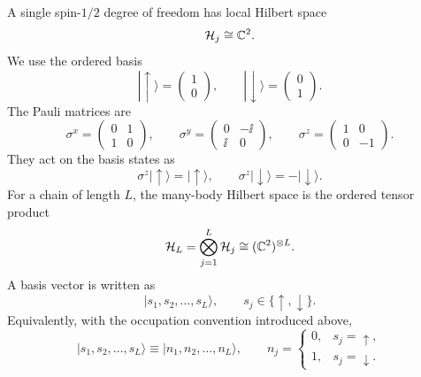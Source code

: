 A single spin-$1/2$ degree of freedom has local Hilbert space
\begin{equation}
    \mathcal{H}_j\cong \mathbb{C}^2.
\end{equation}
We use the ordered basis
\begin{equation}
    |\uparrow\rangle
    =
    \begin{pmatrix}1\\0\end{pmatrix},
    \qquad
    |\downarrow\rangle
    =
    \begin{pmatrix}0\\1\end{pmatrix}.
\end{equation}
The Pauli matrices are
\begin{equation}
    \sigma^x=
    \begin{pmatrix}
        0&1\\
        1&0
    \end{pmatrix},
    \qquad
    \sigma^y=
    \begin{pmatrix}
        0&-\ii\\
        \ii&0
    \end{pmatrix},
    \qquad
    \sigma^z=
    \begin{pmatrix}
        1&0\\
        0&-1
    \end{pmatrix}.
\end{equation}
They act on the basis states as
\begin{equation}
    \sigma^z|\uparrow\rangle=|\uparrow\rangle,
    \qquad
    \sigma^z|\downarrow\rangle=-|\downarrow\rangle.
\end{equation}
For a chain of length $L$, the many-body Hilbert space is the ordered tensor
product
\begin{equation}
    \mathcal{H}_L
    =
    \bigotimes_{j=1}^{L}\mathcal{H}_j
    \cong
    (\mathbb{C}^2)^{\otimes L}.
\end{equation}
A basis vector is written as
\begin{equation}
    |s_1,s_2,\ldots,s_L\rangle,
    \qquad
    s_j\in\{\uparrow,\downarrow\}.
\end{equation}
Equivalently, with the occupation convention introduced above,
\begin{equation}
    |s_1,s_2,\ldots,s_L\rangle
    \equiv
    |n_1,n_2,\ldots,n_L\rangle,
    \qquad
    n_j=\begin{cases}
        0, & s_j=\uparrow,\\
        1, & s_j=\downarrow.
    \end{cases}
\end{equation}

